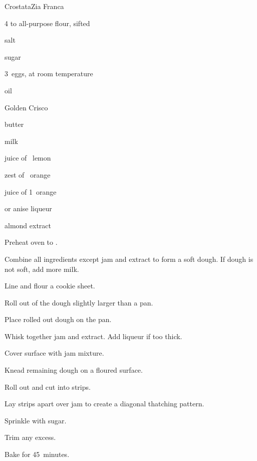 \begin{recipe}{Crostata}{Zia Franca}{}

\begin{ingredients}
\item 4\half{} to  all-purpose flour, sifted
\item \tp{\quarter} salt
\item \Tp{2\half}
\item {} sugar
\item 3~eggs, at room temperature
\item \C{\half} oil
\item \C{\quarter} Golden Crisco
\item \C{\quarter} butter
\item \C{\half} milk
\item juice of \half~lemon
\item zest of \half~orange
\item juice of 1~orange
\item {}  or anise liqueur
\item {} 
\item \tp{\half} almond extract
\end{ingredients}

\begin{directions}
\item Preheat oven to .
\item Combine all ingredients except jam and extract to form a soft dough. If dough is not soft, add more milk.
\item Line and flour a cookie sheet.
\item Roll out \twothird{} of the dough slightly larger than a pan.
\item Place rolled out dough on the pan.
\item Whisk together jam and extract. Add liqueur if too thick.
\item Cover surface with jam mixture.
\item Knead remaining dough on a floured surface.
\item Roll out and cut into \inch{\half} strips.
\item Lay strips  apart over jam to create a diagonal thatching pattern.
\item Sprinkle with sugar.
\item Trim any excess.
\item Bake for 45~minutes.
\end{directions}

\end{recipe}

